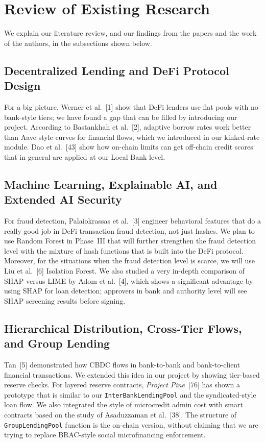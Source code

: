 \documentclass[12pt, a4paper]{report}
\begin{document}
\section{Review of Existing Research}
\label{sec:review-existing}

We explain our literature review, and our findings from the papers and the work of the authors, in the subsections shown below.

\subsection{Decentralized Lending and DeFi Protocol Design}

For a big picture, Werner et al.~[1] show that DeFi lenders use flat pools with no bank-style tiers; we have found a gap that can be filled by introducing our project. According to Bastankhah et al.~[2], adaptive borrow rates work better than Aave-style curves for financial flows, which we introduced in our kinked-rate module. Dao et al.~[43] show how on-chain limits can get off-chain credit scores that in general are applied at our Local Bank level.

\subsection{Machine Learning, Explainable AI, and Extended AI Security}

For fraud detection, Palaiokrassas et al.~[3] engineer behavioral features that do a really good job in DeFi transaction fraud detection, not just hashes. We plan to use Random Forest in Phase~III that will further strengthen the fraud detection level with the mixture of hash functions that is built into the DeFi protocol. Moreover, for the situations when the fraud detection level is scarce, we will use Liu et al.~[6] Isolation Forest. We also studied a very in-depth comparison of SHAP versus LIME by Adom et al.~[4], which shows a significant advantage by using SHAP for loan detection; approvers in bank and authority level will see SHAP screening results before signing.

\subsection{Hierarchical Distribution, Cross-Tier Flows, and Group Lending}
\label{sec:lit-cross-tier}

Tan~[5] demonstrated how CBDC flows in bank-to-bank and bank-to-client financial transactions. We extended this idea in our project by showing tier-based reserve checks. For layered reserve contracts, \textit{Project Pine}~[76] has shown a prototype that is similar to our \texttt{InterBankLendingPool} and the syndicated-style loan flow. We also integrated the style of microcredit admin cost with smart contracts based on the study of Asaduzzaman et al.~[38]. The structure of \texttt{GroupLendingPool} function is the on-chain version, without claiming that we are trying to replace BRAC-style social microfinancing enforcement.
\end{document}
